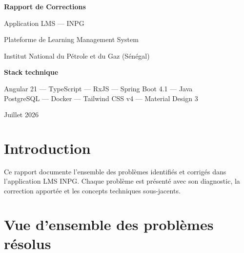 \documentclass[a4paper,12pt,french]{article}
\begin{document}
\begin{titlepage}
\centering
\vspace*{3cm}

{\Huge\bfseries Rapport de Corrections\par}
\vspace{0.5cm}
{\LARGE Application LMS — INPG\par}
\vspace{1cm}
{\large Plateforme de Learning Management System\par}
{\large Institut National du Pétrole et du Gaz (Sénégal)\par}
\vspace{2cm}

{\large\bfseries Stack technique\par}
\vspace{0.3cm}
Angular 21 — TypeScript — RxJS — Spring Boot 4.1 — Java\\
PostgreSQL — Docker — Tailwind CSS v4 — Material Design 3
\vspace{2cm}

{\large Juillet 2026\par}
\vfill
\end{titlepage}

\tableofcontents
\newpage

\section{Introduction}

Ce rapport documente l'ensemble des problèmes identifiés et corrigés dans l'application LMS INPG. Chaque problème est présenté avec son diagnostic, la correction apportée et les concepts techniques sous-jacents.

\section{Vue d'ensemble des problèmes résolus}
\end{document}

